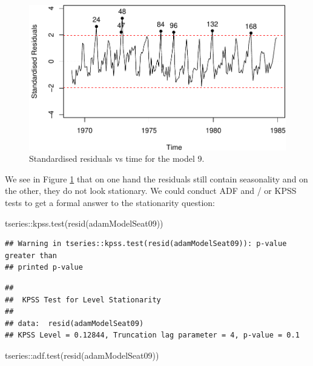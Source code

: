 \documentclass[
]{book}
\newenvironment{Shaded}{\begin{snugshade}}{\end{snugshade}}
\newcommand{\FunctionTok}[1]{\textcolor[rgb]{0.00,0.00,0.00}{#1}}
\newcommand{\NormalTok}[1]{#1}
\newcommand{\SpecialCharTok}[1]{\textcolor[rgb]{0.00,0.00,0.00}{#1}}
\theoremstyle{definition}
\theoremstyle{definition}
\theoremstyle{definition}
\theoremstyle{definition}
\theoremstyle{remark}
\begin{document}
\begin{figure}
\centering
\includegraphics{Svetunkov--2022----ADAM_files/figure-latex/adamModelSeat09ResidvsTime-1.pdf}
\caption{\label{fig:adamModelSeat09ResidvsTime}Standardised residuals vs time for the model 9.}
\end{figure}

We see in Figure \ref{fig:adamModelSeat09ResidvsTime} that on one hand the residuals still contain seasonality and on the other, they do not look stationary. We could conduct ADF and / or KPSS tests \citep[which will be discussed in one of the later Chapters of][]{SvetunkovSBA} to get a formal answer to the stationarity question:

\begin{Shaded}
\begin{Highlighting}[]
\NormalTok{tseries}\SpecialCharTok{::}\FunctionTok{kpss.test}\NormalTok{(}\FunctionTok{resid}\NormalTok{(adamModelSeat09))}
\end{Highlighting}
\end{Shaded}

\begin{verbatim}
## Warning in tseries::kpss.test(resid(adamModelSeat09)): p-value greater than
## printed p-value
\end{verbatim}

\begin{verbatim}
## 
##  KPSS Test for Level Stationarity
## 
## data:  resid(adamModelSeat09)
## KPSS Level = 0.12844, Truncation lag parameter = 4, p-value = 0.1
\end{verbatim}

\begin{Shaded}
\begin{Highlighting}[]
\NormalTok{tseries}\SpecialCharTok{::}\FunctionTok{adf.test}\NormalTok{(}\FunctionTok{resid}\NormalTok{(adamModelSeat09))}
\end{Highlighting}
\end{Shaded}
\end{document}
